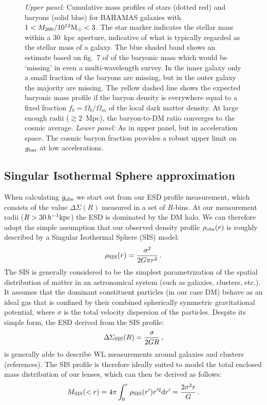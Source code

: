 \documentclass[usenatbib]{mnras}
\newcommand{\hkpc}{\, h^{-1}{\rm{kpc}} }
\newcommand{\un}[1]{_{\rm #1}}
\begin{document}
\begin{figure}
	\caption{\emph{Upper panel: }Cumulative mass profiles of stars (dotted red) and baryons (solid blue) for BAHAMAS galaxies with $1<M_{200}/10^{12}{\rm M}_\odot<3$. The star marker indicates the stellar mass within a $30$~kpc aperture, indicative of what is typically regarded as the stellar mass of a galaxy. The blue shaded band shows an estimate based on fig.~7 of \citet{tumlinson2017} of the baryonic mass which would be `missing' in even a multi-wavelength survey. In the inner galaxy only a small fraction of the baryons are missing, but in the outer galaxy the majority are missing. The yellow dashed line shows the expected baryonic mass profile if the baryon density is everywhere equal to a fixed fraction $f_b=\Omega_b/\Omega_m$ of the local dark matter density. At large enough radii ($\gtrsim 2$~Mpc), the baryon-to-DM ratio converges to the cosmic average. \emph{Lower panel: } As in upper panel, but in acceleration space. The cosmic baryon fraction provides a robust upper limit on $g_{\rm bar}$ at low accelerations.}
	\label{fig:missing-baryons}
\end{figure}


\subsection{Singular Isothermal Sphere approximation}
\label{sec:SIS_approximation}

When calculating $g\un{obs}$ we start out from our ESD profile measurement, which consists of the value $\Delta\Sigma(R)$ measured in a set of $R$-bins. At our measurement radii ($R>30 \hkpc$) the ESD is dominated by the DM halo. We can therefore adopt the simple assumption that our observed density profile $\rho\un{obs}(r)$ is roughly described by a Singular Isothermal Sphere (SIS) model:
\begin{equation}\label{eq:rho_SIS}
	\rho\un{SIS}(r) = \frac{\sigma^2}{2 G \pi r^2} \, . 
\end{equation}
The SIS is generally considered to be the simplest parametrization of the spatial distribution of matter in an astronomical system (such as galaxies, clusters, etc.). It assumes that the dominant constituent particles (in our case DM) behave as an ideal gas that is confined by their combined spherically symmetric gravitational potential, where $\sigma$ is the total velocity dispersion of the particles. Despite its simple form, the ESD derived from the SIS profile:
\begin{equation}\label{eq:ESD_SIS}
\Delta\Sigma\un{SIS}(R) = \frac{\sigma}{2 G R} \, ,
\end{equation}
is generally able to describe WL measurements around galaxies and clusters (references). The SIS profile is therefore ideally suited to model the total enclosed mass distribution of our lenses, which can then be derived as follows:
\begin{equation}\label{eq:mass_SIS}
	M\un{SIS}(<r) = 4 \pi \int_{0}^{r}\rho\un{SIS}(r') r'^2 {\rm d} r' = \frac{2\sigma^2 r}{G} \, .
\end{equation}
\end{document}
